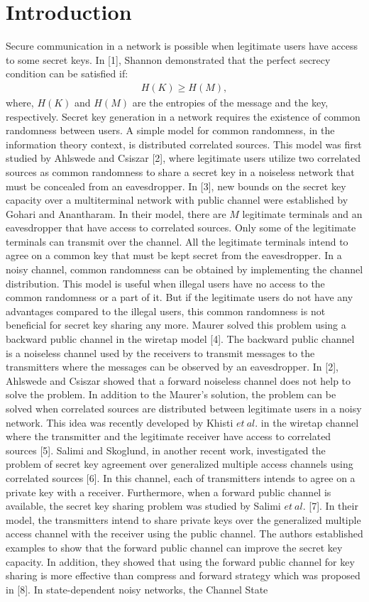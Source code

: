 \documentclass[conference,8pt]{IEEEtran}
\begin{document}
\section{Introduction}
Secure communication in a network is possible when legitimate users have access to some secret keys. In [1], Shannon demonstrated that the perfect secrecy condition can be satisfied if:
\begin{align}
H(K) \geq H(M),  \nonumber
\end{align}
where, $H(K)$ and $H(M)$ are the entropies of the message and the key, respectively. Secret key generation in a network requires the existence of common randomness between users. A simple model for common randomness, in the information theory context, is distributed correlated sources. This model was first studied by Ahlswede and Csiszar  [2], where legitimate users utilize two correlated sources as common randomness to share a secret key in a noiseless network that must be concealed from an eavesdropper. In [3], new bounds on the secret key capacity over a multiterminal network with public channel were established by Gohari and Anantharam. In their model, there are $M$ legitimate terminals and an eavesdropper that have access to correlated sources. Only some of the legitimate terminals can transmit over the channel. All the legitimate terminals intend to agree on a common key that must be kept secret from the eavesdropper. In a noisy channel, common randomness can be obtained by implementing the channel distribution. This model is useful when illegal users have no access to the common randomness or a part of it. But if the legitimate users do not have any advantages compared to the illegal users, this common randomness is not beneficial for secret key sharing any more. Maurer solved this problem using a backward public channel in the wiretap model [4]. The backward public channel is a noiseless channel used by the receivers to transmit messages to the transmitters where the messages can be observed by an eavesdropper. In [2], Ahlswede and Csiszar showed that a forward noiseless channel does not help to solve the problem. In addition to the Maurer's solution, the problem can be solved when correlated sources are distributed between legitimate users in a noisy network. This idea was recently developed by Khisti $ et \ al. $ in the wiretap channel where the transmitter and the legitimate receiver have access to correlated sources [5]. Salimi and Skoglund, in another recent work, investigated the problem of secret key agreement over generalized multiple access channels using correlated sources [6]. In this channel, each of transmitters intends to agree on a private key with a receiver. Furthermore, when a forward public channel is available, the secret key sharing problem was studied by Salimi $ et \ al. $ [7]. In their model, the transmitters intend to share private keys over the generalized multiple access channel with the receiver using the public channel. The authors established examples to show that the forward public channel can improve the secret key capacity. In addition, they showed that using the forward public channel for key sharing is more effective than compress and forward strategy which was proposed in [8]. In state-dependent noisy networks, the Channel State 
\end{document}
